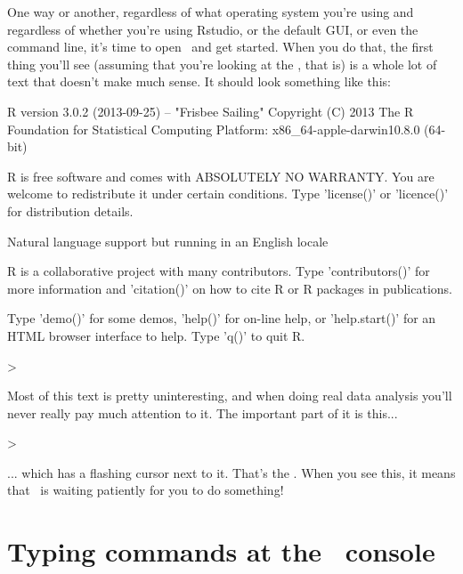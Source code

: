 One way or another, regardless of what operating system you're using and regardless of whether you're using Rstudio, or the default GUI, or even the command line, it's time to open \R\ and get started. When you do that, the first thing you'll see (assuming that you're looking at the , that is) is a whole lot of text that doesn't make much sense. It should look something like this:
\begin{rblock}
R version 3.0.2 (2013-09-25) -- "Frisbee Sailing"
Copyright (C) 2013 The R Foundation for Statistical Computing
Platform: x86_64-apple-darwin10.8.0 (64-bit)

R is free software and comes with ABSOLUTELY NO WARRANTY.
You are welcome to redistribute it under certain conditions.
Type 'license()' or 'licence()' for distribution details.

  Natural language support but running in an English locale

R is a collaborative project with many contributors.
Type 'contributors()' for more information and
'citation()' on how to cite R or R packages in publications.

Type 'demo()' for some demos, 'help()' for on-line help, or
'help.start()' for an HTML browser interface to help.
Type 'q()' to quit R.

> 
\end{rblock}
Most of this text is pretty uninteresting, and when doing real data analysis you'll never really pay much attention to it. The important part of it is this...
\begin{rblock}
> 
\end{rblock}
... which has a flashing cursor next to it. That's the . When you see this, it means that \R\ is waiting patiently for you to do something! 


\section{Typing commands at the \R\ console\label{sec:firstcommand}}


